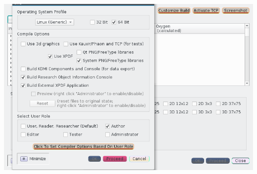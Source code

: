 \begin{frame}{}
\begin{annotatedFigure}{20pt}{0pt}{\includegraphics[scale=1.25]{texs/config.png}}
        
      
  
        \end{annotatedFigure}


    \end{frame}



